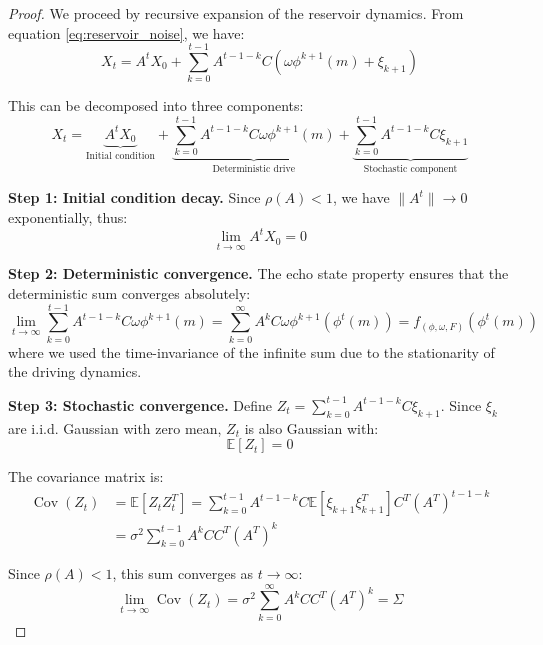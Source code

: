 \documentclass[10pt,a4paper]{amsart}
\DeclareMathOperator{\Cov}{Cov}
\newcommand{\E}{\mathbb{E}}
\begin{document}
\begin{proof}
We proceed by recursive expansion of the reservoir dynamics. From equation \eqref{eq:reservoir_noise}, we have:
\begin{equation}
X_t = A^t X_0 + \sum_{k=0}^{t-1} A^{t-1-k}C(\omega\phi^{k+1}(m) + \xi_{k+1})
\end{equation}

This can be decomposed into three components:
\begin{equation}
X_t = \underbrace{A^t X_0}_{\text{Initial condition}} + \underbrace{\sum_{k=0}^{t-1} A^{t-1-k}C\omega\phi^{k+1}(m)}_{\text{Deterministic drive}} + \underbrace{\sum_{k=0}^{t-1} A^{t-1-k}C\xi_{k+1}}_{\text{Stochastic component}}
\end{equation}

\textbf{Step 1: Initial condition decay.} Since $\rho(A) < 1$, we have $\|A^t\| \to 0$ exponentially, thus:
\begin{equation}
\lim_{t \to \infty} A^t X_0 = 0
\end{equation}

\textbf{Step 2: Deterministic convergence.} The echo state property ensures that the deterministic sum converges absolutely:
\begin{equation}
\lim_{t \to \infty} \sum_{k=0}^{t-1} A^{t-1-k}C\omega\phi^{k+1}(m) = \sum_{k=0}^{\infty} A^k C\omega\phi^{k+1}(\phi^t(m)) = f_{(\phi,\omega,F)}(\phi^t(m))
\end{equation}
where we used the time-invariance of the infinite sum due to the stationarity of the driving dynamics.

\textbf{Step 3: Stochastic convergence.} Define $Z_t = \sum_{k=0}^{t-1} A^{t-1-k}C\xi_{k+1}$. Since $\xi_k$ are i.i.d. Gaussian with zero mean, $Z_t$ is also Gaussian with:
\begin{equation}
\E[Z_t] = 0
\end{equation}

The covariance matrix is:
\begin{align}
\Cov(Z_t) &= \E[Z_t Z_t^T] = \sum_{k=0}^{t-1} A^{t-1-k}C \E[\xi_{k+1}\xi_{k+1}^T] C^T (A^T)^{t-1-k}\\
&= \sigma^2 \sum_{k=0}^{t-1} A^k CC^T (A^T)^k
\end{align}

Since $\rho(A) < 1$, this sum converges as $t \to \infty$:
\begin{equation}
\lim_{t \to \infty} \Cov(Z_t) = \sigma^2 \sum_{k=0}^{\infty} A^k CC^T (A^T)^k = \Sigma
\end{equation}


\end{proof}
\end{document}
